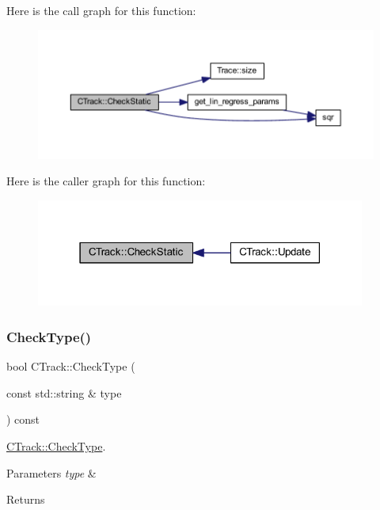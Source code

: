 Here is the call graph for this function\+:\nopagebreak
\begin{figure}[H]
\begin{center}
\leavevmode
\includegraphics[width=350pt]{class_c_track_ab16e6724f0e9d22301d46efda587f567_cgraph}
\end{center}
\end{figure}
Here is the caller graph for this function\+:\nopagebreak
\begin{figure}[H]
\begin{center}
\leavevmode
\includegraphics[width=307pt]{class_c_track_ab16e6724f0e9d22301d46efda587f567_icgraph}
\end{center}
\end{figure}
\mbox{\label{class_c_track_ae6961feb57624fbb2746b07b06769368}} 
\subsubsection{\texorpdfstring{Check\+Type()}{CheckType()}}
{\footnotesize\ttfamily bool C\+Track\+::\+Check\+Type (\begin{DoxyParamCaption}\item[{const std\+::string \&}]{type }\end{DoxyParamCaption}) const}



\mbox{\hyperlink{class_c_track_ae6961feb57624fbb2746b07b06769368}{C\+Track\+::\+Check\+Type}}. 


\begin{DoxyParams}{Parameters}
{\em type} & \\
\hline
\end{DoxyParams}
\begin{DoxyReturn}{Returns}

\end{DoxyReturn}


